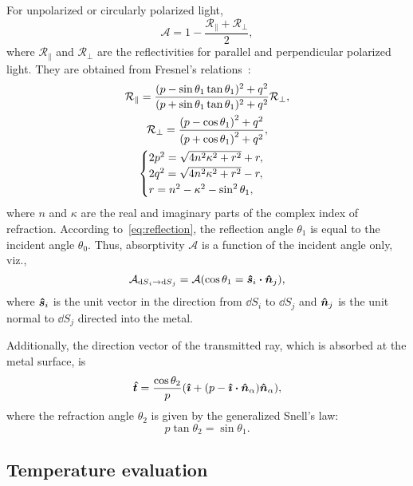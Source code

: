 \documentclass[final]{elsarticle} %
\newcommand{\Abso}{\mathcal{A}}
\newcommand{\Refl}{\mathcal{R}}
\newcommand{\viewfactor}[3]{{#1}_{\dd{S}#2\to\dd{S}#3}}
\newcommand{\bn}{\vu*{n}}
\newcommand{\bs}{\vu*{s}}
\newcommand{\bi}{\vu*{\imath}}
\newcommand{\bt}{\vu*{t}}
\begin{document}
For unpolarized or circularly polarized light,
\begin{equation}\label{eq:A}
    \Abso = 1 - \frac{\Refl_\parallel + \Refl_\perp}2,
\end{equation}
where $\Refl_\parallel$ and $\Refl_\perp$ are the reflectivities for parallel and perpendicular polarized light.
They are obtained from Fresnel's relations~\cite{modest2013radiative}:
\begin{gather}
    \Refl_\parallel = \frac{(p - \sin\theta_1\tan\theta_1)^2 + q^2}
        {(p + \sin\theta_1\tan\theta_1)^2 + q^2}\Refl_\perp, \label{eq:Rparallel}\\
    \Refl_\perp = \frac{\qty(p-\cos\theta_1)^2 + q^2}{\qty(p+\cos\theta_1)^2 + q^2}, \label{eq:Rperp}\\
    \begin{cases}
        2p^2 = \sqrt{4n^2\kappa^2 + r^2} + r, \\
        2q^2 = \sqrt{4n^2\kappa^2 + r^2} - r, \\
        r = n^2 - \kappa^2 - \sin^2\theta_1,
    \end{cases} \label{eq:pqr}
\end{gather}
where $n$ and $\kappa$ are the real and imaginary parts of the complex index of refraction.
According to~\eqref{eq:reflection}, the reflection angle $\theta_1$
is equal to the incident angle $\theta_0$.
Thus, absorptivity $\Abso$ is a function of the incident angle only, viz.,
\begin{equation}\label{eq:Aij}
    \viewfactor{\Abso}{_i}{_j} = \Abso(\cos\theta_1 = \bs_i\vdot\bn_j),
\end{equation}
where $\bs_i$ is the unit vector in the direction from $\dd{S_i}$ to $\dd{S_j}$
and $\bn_j$ is the unit normal to $\dd{S_j}$ directed into the metal.

Additionally, the direction vector of the transmitted ray, which is absorbed at the metal surface, is
\begin{equation}\label{eq:refraction}
    \bt = \frac{\cos\theta_2}{p}(\bi + (p - \bi\vdot\bn_\alpha)\bn_\alpha),
\end{equation}
where the refraction angle $\theta_2$ is given by the generalized Snell's law:
\begin{equation}\label{eq:Snell}
    p\tan\theta_2 = \sin\theta_1.
\end{equation}

\subsection{Temperature evaluation}
\end{document}
